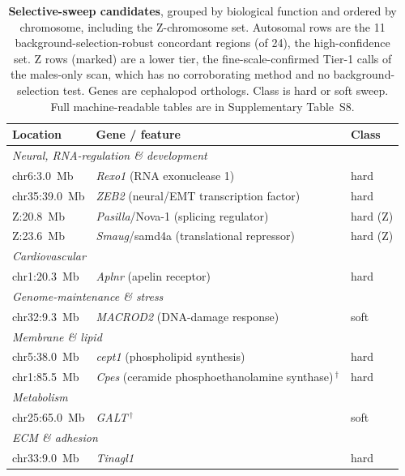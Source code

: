 \documentclass[11pt]{article}
\begin{document}
\begin{table}[t]\centering
  \caption{\textbf{Selective-sweep candidates}, grouped by biological function and ordered by
    chromosome, including the Z-chromosome set. Autosomal rows are the 11 background-selection-robust concordant regions (of 24), the high-confidence set. Z rows (marked) are a lower tier, the fine-scale-confirmed Tier-1 calls of the males-only scan, which has no corroborating method and no background-selection test. Genes are cephalopod orthologs. Class is hard or soft sweep. Full machine-readable tables are in
    Supplementary Table~S8.}
  \label{tab:sweep}
  \begin{tabular}{lll}
    \toprule
    Location & Gene / feature & Class \\
    \midrule
    \multicolumn{3}{l}{\itshape Neural, RNA-regulation \& development}\\
    chr6:3.0~Mb   & \textit{Rexo1} (RNA exonuclease 1)                    & hard \\
    chr35:39.0~Mb & \textit{ZEB2} (neural/EMT transcription factor)        & hard \\
    Z:20.8~Mb     & \textit{Pasilla}/Nova-1 (splicing regulator)          & hard (Z) \\
    Z:23.6~Mb     & \textit{Smaug}/samd4a (translational repressor)       & hard (Z) \\
    \multicolumn{3}{l}{\itshape Cardiovascular}\\
    chr1:20.3~Mb  & \textit{Aplnr} (apelin receptor)                      & hard \\
    \multicolumn{3}{l}{\itshape Genome-maintenance \& stress}\\
    chr32:9.3~Mb  & \textit{MACROD2} (DNA-damage response)                & soft \\
    \multicolumn{3}{l}{\itshape Membrane \& lipid}\\
    chr5:38.0~Mb  & \textit{cept1} (phospholipid synthesis)               & hard \\
    chr1:85.5~Mb  & \textit{Cpes} (ceramide phosphoethanolamine synthase)\,$^{\dagger}$   & hard \\
    \multicolumn{3}{l}{\itshape Metabolism}\\
    chr25:65.0~Mb & \textit{GALT}\,$^{\dagger}$                           & soft \\
    \multicolumn{3}{l}{\itshape ECM \& adhesion}\\
    chr33:9.0~Mb  & \textit{Tinagl1}                                      & hard \\

\end{tabular}
\end{table}
\end{document}
